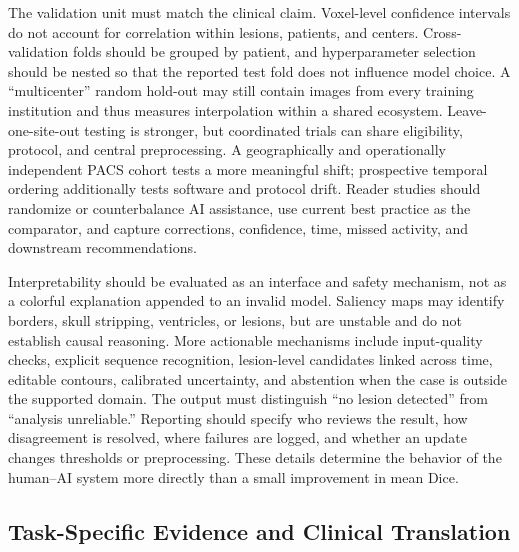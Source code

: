 \documentclass[journal,twoside,web]{ieeecolor}
\begin{document}
The validation unit must match the clinical claim. Voxel-level confidence intervals do not account for correlation within lesions, patients, and centers. Cross-validation folds should be grouped by patient, and hyperparameter selection should be nested so that the reported test fold does not influence model choice. A ``multicenter'' random hold-out may still contain images from every training institution and thus measures interpolation within a shared ecosystem. Leave-one-site-out testing is stronger, but coordinated trials can share eligibility, protocol, and central preprocessing. A geographically and operationally independent PACS cohort tests a more meaningful shift; prospective temporal ordering additionally tests software and protocol drift. Reader studies should randomize or counterbalance AI assistance, use current best practice as the comparator, and capture corrections, confidence, time, missed activity, and downstream recommendations.


Interpretability should be evaluated as an interface and safety mechanism, not as a colorful explanation appended to an invalid model. Saliency maps may identify borders, skull stripping, ventricles, or lesions, but are unstable and do not establish causal reasoning. More actionable mechanisms include input-quality checks, explicit sequence recognition, lesion-level candidates linked across time, editable contours, calibrated uncertainty, and abstention when the case is outside the supported domain. The output must distinguish ``no lesion detected'' from ``analysis unreliable.'' Reporting should specify who reviews the result, how disagreement is resolved, where failures are logged, and whether an update changes thresholds or preprocessing. These details determine the behavior of the human--AI system more directly than a small improvement in mean Dice.


\subsection{Task-Specific Evidence and Clinical Translation}\label{subsec:task-specific-evidence-and-clinical-translation}
\end{document}
